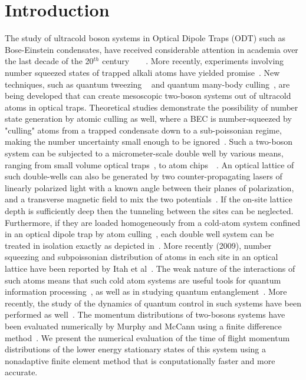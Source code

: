 \documentclass{article}
\begin{document}
\section{Introduction}
The study of ultracold boson systems in Optical Dipole Traps (ODT) such as Bose-Einstein condensates, have received considerable attention in academia over the last decade of the 20$^{th}$ century~\cite{weiman}~\cite{weiman:cornell}~\cite{ketterle}~\cite{ketterle2}. More recently, experiments involving number squeezed states of trapped alkali atoms have yielded promise~\cite{raizen}. New techniques, such as  quantum tweezing ~\cite{diener} and quantum many-body culling~\cite{raizen}, are being developed that can create mesoscopic two-boson systems out of ultracold atoms in optical traps. Theoretical studies demonstrate the possibility of number state generation by atomic culling as well, where a BEC is number-squeezed by "culling" atoms from a trapped condensate down to a sub-poissonian regime, making the number uncertainty small enough to be ignored~\cite{raizen}. Such a two-boson system can be subjected to a micrometer-scale double well by various means, ranging from small volume optical traps~\cite{raizen}, to atom chips~\cite{doublewell:chip}~\cite{doublewell:chip:nature}. An optical lattice of such double-wells can also be generated by two counter-propagating lasers of linearly polarized light with a known angle between their planes of polarization, and a transverse magnetic field to mix the two potentials~\cite{Deutsch:Jessen}. If the on-site lattice depth is sufficiently deep then the tunneling between the sites can be neglected. Furthermore, if they are loaded homogeneously from a cold-atom system confined in an optical dipole trap by atom culling~\cite{raizen}, each double well system can be treated in isolation exactly as depicted in~\cite{mypaper}. More recently (2009), number squeezing and subpoissonian distribution of atoms in each site in an optical lattice have been reported by Itah et al~\cite{technion:oplattice-culling}. The weak nature of the interactions of such atoms means that such cold atom systems are useful tools for quantum information processing~\cite{Monroe:Nature}, as well as in studying quantum entanglement~\cite{Jaksch:Zoller}. More recently, the study of the dynamics of quantum control in such systems have been performed as well~\cite{mypaper}. The momentum distributions of two-bosons systems have been evaluated numerically by Murphy and McCann using a finite difference method~\cite{McCann:doublewell}. We present the numerical evaluation of the time of flight momentum distributions of the lower energy stationary states of this system using a nonadaptive finite element method that is conputationally faster and more accurate.
\end{document}

